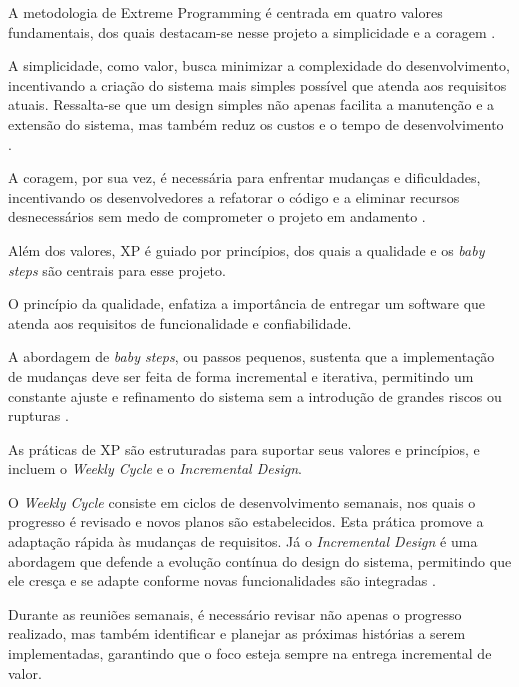 
A metodologia de Extreme Programming é centrada em quatro valores fundamentais, dos quais destacam-se nesse projeto a simplicidade e a coragem \cite{beckKent2004}. 

A simplicidade, como valor, busca minimizar a complexidade do desenvolvimento, incentivando a criação do sistema mais simples possível que atenda aos requisitos atuais. Ressalta-se que um design simples não apenas facilita a manutenção e a extensão do sistema, mas também reduz os custos e o tempo de desenvolvimento \cite{beckKent2004}.

A coragem, por sua vez, é necessária para enfrentar mudanças e dificuldades, incentivando os desenvolvedores a refatorar o código e a eliminar recursos desnecessários sem medo de comprometer o projeto em andamento \cite{beckKent2004}.


Além dos valores, XP é guiado por princípios, dos quais a qualidade e os \textit{baby steps} são centrais para esse projeto. 

O princípio da qualidade, \cite{beckKent2004} enfatiza a importância de entregar um software que atenda aos requisitos de funcionalidade e confiabilidade. 

A abordagem de \textit{baby steps}, ou passos pequenos, sustenta que a implementação de mudanças deve ser feita de forma incremental e iterativa, permitindo um constante ajuste e refinamento do sistema sem a introdução de grandes riscos ou rupturas \cite{beckKent2004}.


As práticas de XP são estruturadas para suportar seus valores e princípios, e incluem o \textit{Weekly Cycle} e o \textit{Incremental Design}. 

O \textit{Weekly Cycle} consiste em ciclos de desenvolvimento semanais, nos quais o progresso é revisado e novos planos são estabelecidos. Esta prática promove a adaptação rápida às mudanças de requisitos. Já o \textit{Incremental Design} é uma abordagem que defende a evolução contínua do design do sistema, permitindo que ele cresça e se adapte conforme novas funcionalidades são integradas \cite{beckKent2004}.

Durante as reuniões semanais, é necessário revisar não apenas o progresso realizado, mas também identificar e planejar as próximas histórias a serem implementadas, garantindo que o foco esteja sempre na entrega incremental de valor.

